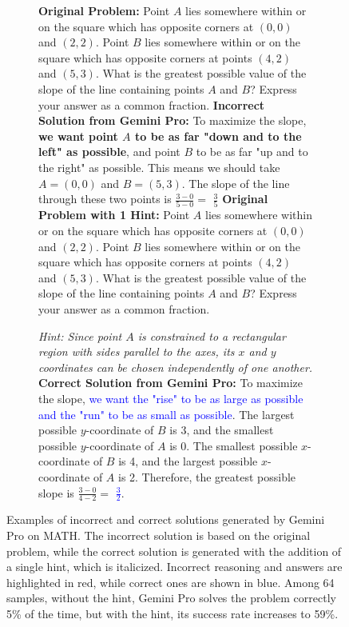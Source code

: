 \iffalse
\begin{figure}[h]
\begin{subfigure}{\linewidth}
\begin{tcolorbox}[colback=blue!5!white,colframe=mybrown!75!black]
\begin{small}
\textbf{Original Problem:}
Point $A$ lies somewhere within or on the square which has opposite corners at $(0,0)$ and $(2,2)$. Point $B$ lies somewhere within or on the square which has opposite corners at points $(4,2)$ and $(5,3)$. What is the greatest possible value of the slope of the line containing points $A$ and $B$? Express your answer as a common fraction.
\Sepline
\textbf{Incorrect Solution from Gemini Pro:}
To maximize the slope, \textbf{\textcolor{mistake}{we want point $A$ to be as far "down and to the left" as possible}}, and point $B$ to be as far "up and to the right" as possible. This means we should take $A = (0,0)$ and $B = (5,3)$. The slope of the line through these two points is $\frac{3 - 0}{5 - 0} =$ \textbf{\textcolor{mistake}{$\boxed{\frac{3}{5}}$}}
\Sepline
\textbf{Original Problem with 1 Hint:}
Point $A$ lies somewhere within or on the square which has opposite corners at $(0,0)$ and $(2,2)$. Point $B$ lies somewhere within or on the square which has opposite corners at points $(4,2)$ and $(5,3)$. What is the greatest possible value of the slope of the line containing points $A$ and $B$? Express your answer as a common fraction.

\textit{Hint: Since point $A$ is constrained to a rectangular region with sides parallel to the axes, its $x$ and $y$ coordinates can be chosen independently of one another.}
\Sepline
\textbf{Correct Solution from Gemini Pro:}
To maximize the slope, \textcolor{blue}{we want the "rise" to be as large as possible and the "run" to be as small as possible}. The largest possible $y$-coordinate of $B$ is 3, and the smallest possible $y$-coordinate of $A$ is 0. The smallest possible $x$-coordinate of $B$ is 4, and the largest possible $x$-coordinate of $A$ is 2. Therefore, the greatest possible slope is $\frac{3-0}{4-2}=$ \textcolor{blue}{$\boxed{\frac{3}{2}}$}. 
\end{small}
\end{tcolorbox}
\end{subfigure}\hfill
\caption{Examples of incorrect and correct solutions generated by Gemini Pro on MATH. The incorrect solution is based on the original problem, while the correct solution is generated with the addition of a single hint, which is italicized. Incorrect reasoning and answers are highlighted in red, while correct ones are shown in blue. Among 64 samples, without the hint, Gemini Pro solves the problem correctly 5\% of the time, but with the hint, its success rate increases to 59\%.}
\label{fig:example_gotcha_step}
\end{figure}


